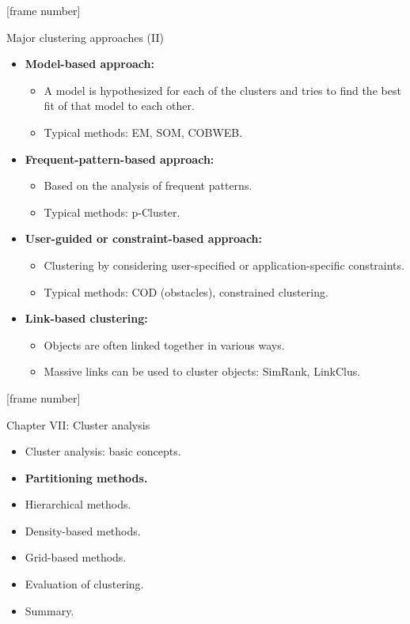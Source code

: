 \documentclass[aspectratio=169,t,xcolor=dvipsnames]{beamer}
\begin{document}
  {
    [frame number]
    \begin{frame}{Major clustering approaches (II)}
        \begin{itemize}
          \item \textbf{Model-based approach:}
          \begin{itemize}
            \item A model is hypothesized for each of the clusters and tries to find the best fit of that model to each other.
            \item Typical methods: EM, SOM, COBWEB.
          \end{itemize}
          \item \textbf{Frequent-pattern-based approach:}
          \begin{itemize}
            \item Based on the analysis of frequent patterns.
            \item Typical methods: p-Cluster.
          \end{itemize}
          \item \textbf{User-guided or constraint-based approach:}
          \begin{itemize}
            \item Clustering by considering user-specified or application-specific constraints.
            \item Typical methods: COD (obstacles), constrained clustering.
          \end{itemize}
          \item \textbf{Link-based clustering:}
          \begin{itemize}
            \item Objects are often linked together in various ways.
            \item Massive links can be used to cluster objects: SimRank, LinkClus.
          \end{itemize}
        \end{itemize}
    \end{frame}
  }

  {
    [frame number]
    \begin{frame}{Chapter VII: Cluster analysis}
        \begin{itemize}
            \item Cluster analysis: basic concepts.
            \item \textbf{Partitioning methods.}
            \item Hierarchical methods.
            \item Density-based methods.
            \item Grid-based methods.
            \item Evaluation of clustering.
            \item Summary.
        \end{itemize}
    \end{frame}
  }
\end{document}
